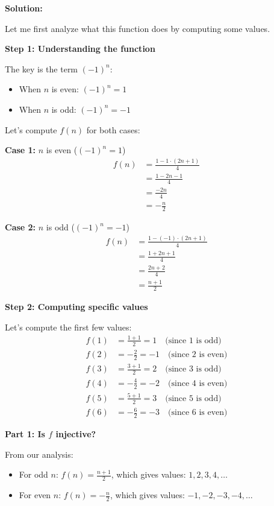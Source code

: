 \documentclass[12pt,a4paper]{article}
\theoremstyle{definition}
\theoremstyle{remark}
\begin{document}
\textbf{Solution:}

Let me first analyze what this function does by computing some values.

\textbf{Step 1: Understanding the function}

The key is the term $(-1)^n$:
\begin{itemize}
\item When $n$ is even: $(-1)^n = 1$
\item When $n$ is odd: $(-1)^n = -1$
\end{itemize}

Let's compute $f(n)$ for both cases:

\textbf{Case 1:} $n$ is even ($(-1)^n = 1$)
\begin{align}
f(n) &= \frac{1 - 1 \cdot (2n + 1)}{4}\\
&= \frac{1 - 2n - 1}{4}\\
&= \frac{-2n}{4}\\
&= -\frac{n}{2}
\end{align}

\textbf{Case 2:} $n$ is odd ($(-1)^n = -1$)
\begin{align}
f(n) &= \frac{1 - (-1) \cdot (2n + 1)}{4}\\
&= \frac{1 + 2n + 1}{4}\\
&= \frac{2n + 2}{4}\\
&= \frac{n + 1}{2}
\end{align}

\textbf{Step 2: Computing specific values}

Let's compute the first few values:
\begin{align}
f(1) &= \frac{1 + 1}{2} = 1 \quad \text{(since 1 is odd)}\\
f(2) &= -\frac{2}{2} = -1 \quad \text{(since 2 is even)}\\
f(3) &= \frac{3 + 1}{2} = 2 \quad \text{(since 3 is odd)}\\
f(4) &= -\frac{4}{2} = -2 \quad \text{(since 4 is even)}\\
f(5) &= \frac{5 + 1}{2} = 3 \quad \text{(since 5 is odd)}\\
f(6) &= -\frac{6}{2} = -3 \quad \text{(since 6 is even)}
\end{align}

\textbf{Part 1: Is $f$ injective?}

From our analysis:
\begin{itemize}
\item For odd $n$: $f(n) = \frac{n + 1}{2}$, which gives values: $1, 2, 3, 4, \ldots$
\item For even $n$: $f(n) = -\frac{n}{2}$, which gives values: $-1, -2, -3, -4, \ldots$
\end{itemize}
\end{document}
